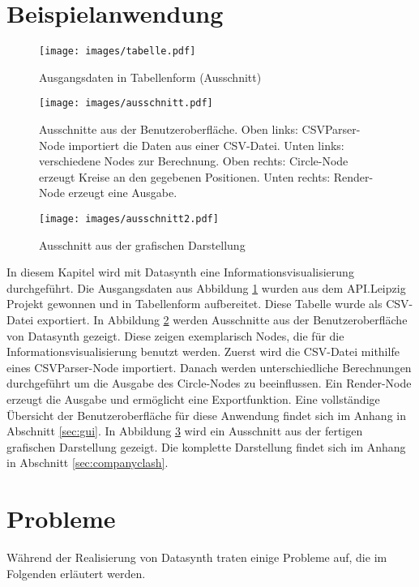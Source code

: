 \documentclass[a4paper, 
               12pt,
               DIV=calc,
               version=first,
               pdftex,
               headsepline,
               footsepline,
               bibliography=totocnumbered,
               listof=numbered]{scrreprt}
\begin{document}
\section{Beispielanwendung}
\label{sec:Beispielanwendung}
\begin{figure}
\centering
\texttt{[image: images/tabelle.pdf]}
\caption{Ausgangsdaten in Tabellenform (Ausschnitt)}
\label{fig:apitabelle}
\end{figure}
\begin{figure}
\centering
\texttt{[image: images/ausschnitt.pdf]}
\caption{Ausschnitte aus der Benutzeroberfläche.
Oben links: CSVParser-Node importiert die Daten aus einer CSV-Datei.
Unten links: verschiedene Nodes zur Berechnung.
Oben rechts: Circle-Node erzeugt Kreise an den gegebenen Positionen.
Unten rechts: Render-Node erzeugt eine Ausgabe.}
\label{fig:guiausschnitt}
\end{figure}
\begin{figure}
\centering
\texttt{[image: images/ausschnitt2.pdf]}
\caption{Ausschnitt aus der grafischen Darstellung}
\label{fig:companyausschnitt}
\end{figure}
In diesem Kapitel wird mit Datasynth eine Informationsvisualisierung durchgeführt.
Die Ausgangsdaten aus Abbildung \ref{fig:apitabelle} wurden aus dem API.Leipzig Projekt 
gewonnen und in Tabellenform aufbereitet. Diese Tabelle wurde
als CSV-Datei exportiert.
In Abbildung \ref{fig:guiausschnitt} werden Ausschnitte aus der Benutzeroberfläche von
Datasynth gezeigt. Diese zeigen exemplarisch Nodes, die für die Informationsvisualisierung
benutzt werden. Zuerst wird die CSV-Datei mithilfe eines CSVParser-Node importiert. Danach
werden unterschiedliche Berechnungen durchgeführt um die Ausgabe des Circle-Nodes zu beeinflussen.
Ein Render-Node erzeugt die Ausgabe und ermöglicht eine Exportfunktion.
Eine vollständige Übersicht der Benutzeroberfläche für diese Anwendung findet sich im Anhang
in Abschnitt \ref{sec:gui}.
In Abbildung \ref{fig:companyausschnitt} wird ein Ausschnitt aus der fertigen grafischen
Darstellung gezeigt. Die komplette Darstellung findet sich im Anhang in Abschnitt \ref{sec:companyclash}.

\section{Probleme}
\label{sec:Probleme}
Während der Realisierung von Datasynth traten einige Probleme auf, die im Folgenden
erläutert werden.
\end{document}
